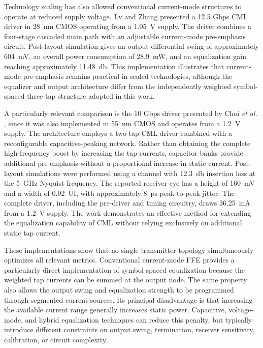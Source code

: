 Technology scaling has also allowed conventional current-mode structures to operate at reduced supply voltage. Lv and Zhang \cite{lv_cml_28nm_2018} presented a 12.5 Gbps \ac{CML} driver in \SI{28}{\nano\meter} \ac{CMOS} operating from a \SI{1.05}{\volt} supply. The driver combines a four-stage cascaded main path with an adjustable current-mode pre-emphasis circuit. Post-layout simulation gives an output differential swing of approximately \SI{604}{\milli\volt}, an overall power consumption of \SI{28.9}{\milli\watt}, and an equalization gain reaching approximately \SI{11.48}{\decibel}. This implementation illustrates that current-mode pre-emphasis remains practical in scaled technologies, although the equalizer and output architecture differ from the independently weighted symbol-spaced three-tap structure adopted in this work.

A particularly relevant comparison is the 10 Gbps driver presented by Choi \textit{et al.} \cite{choi2019}, since it was also implemented in \SI{55}{\nano\meter} CMOS and operates from a \SI{1.2}{\volt} supply. The architecture employs a two-tap \ac{CML} driver combined with a reconfigurable capacitive-peaking network. Rather than obtaining the complete high-frequency boost by increasing the tap currents, capacitor banks provide additional pre-emphasis without a proportional increase in static current. Post-layout simulations were performed using a channel with \SI{12.3}{\decibel} insertion loss at the \SI{5}{\giga\hertz} Nyquist frequency. The reported receiver eye has a height of \SI{160}{\milli\volt} and a width of 0.92~UI, with approximately \SI{8}{\pico\second} peak-to-peak jitter. The complete driver, including the pre-driver and timing circuitry, draws \SI{36.25}{\milli\ampere} from a \SI{1.2}{\volt} supply. The work demonstrates an effective method for extending the equalization capability of \ac{CML} without relying exclusively on additional static tap current.

These implementations show that no single transmitter topology simultaneously optimizes all relevant metrics. Conventional current-mode \ac{FFE} provides a particularly direct implementation of symbol-spaced equalization because the weighted tap currents can be summed at the output node. The same property also allows the output swing and equalization strength to be programmed through segmented current sources. Its principal disadvantage is that increasing the available current range generally increases static power. Capacitive, voltage-mode, and hybrid equalization techniques can reduce this penalty, but typically introduce different constraints on output swing, termination, receiver sensitivity, calibration, or circuit complexity.

